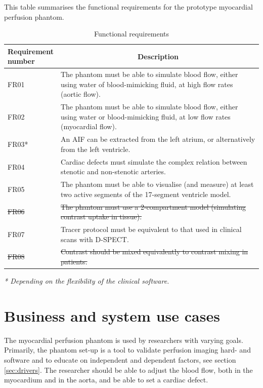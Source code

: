 \begin{table}[h]
\caption{Functional requirements}
\label{tab:funcreq}
This table summarises the functional requirements for the prototype myocardial perfusion phantom.
\begin{tabular}{l|p{120mm}|}
	\makecell[l]{Requirement \\ number} & \multicolumn{1}{c}{Description}\\
	\hline
	FR01 & The phantom must be able to simulate blood flow, either using water of blood-mimicking fluid, at high flow rates (aortic flow). \\ 
	\rowcolor{Gray}
	FR02 & The phantom must be able to simulate blood flow, either using water or blood-mimicking fluid, at low flow rates (myocardial flow). \\
	FR03* & An \ac{AIF} can be extracted from the left atrium, or alternatively from the left ventricle. \\
	\rowcolor{Gray}
	FR04 & Cardiac defects must simulate the complex relation between stenotic and non-stenotic arteries. \\
	FR05 & The phantom must be able to visualise (and measure) at least two active segments of the 17-segment ventricle model. \\
	\rowcolor{Gray}
	\sout{FR06} & \sout{The phantom must use a 2-compartment model (simulating contrast uptake in tissue).} \\
	FR07 & Tracer protocol must be equivalent to that used in clinical scans with D-SPECT. \\
	\rowcolor{Gray}
	\sout{FR08} & \sout{Contrast should be mixed equivalently to contrast mixing in patients.} \\
	\cline{2-2}
\end{tabular}
\raggedright
\textit{* Depending on the flexibility of the clinical software.}
\end{table}

\section{Business and system use cases}	
The myocardial perfusion phantom is used by researchers with varying goals. Primarily, the phantom set-up is a tool to validate perfusion imaging hard- and software and to educate on independent and dependent factors, see section \ref{sec:drivers}. The researcher should be able to adjust the blood flow, both in the myocardium and in the aorta, and be able to set a cardiac defect.

